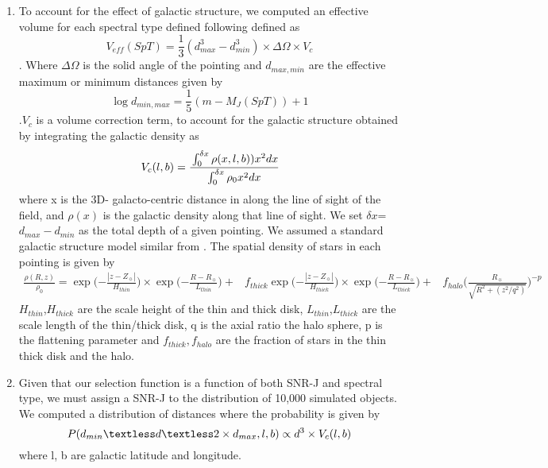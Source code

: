 \documentclass[manuscript]{aastex}
\begin{document}
\begin{enumerate}
\item To account for the effect of galactic structure, we computed an effective volume for each spectral type defined  following \cite{2007ApJ...659..655B} defined as  \begin{equation} V_{eff}(SpT)=\frac{1}{3} (d_{max}^3-d_{min}^3) \times \Delta \Omega \times V_c \end{equation}. Where $\Delta \Omega$ is the solid angle of the pointing and  $d_{max, min}$ are the effective maximum or minimum distances given by \begin{equation} \log d_{min, max} =\frac{1}{5}(m-M_J(SpT))+1 \end{equation}.$V_c$ is a volume correction term, to account for the galactic structure obtained by integrating the galactic density as 
\begin{equation*}
V_c (l, b)=\cfrac{\int _{0} ^{\delta x} \rho (x, l, b))  x^2 dx}{\int  _{0} ^{\delta x} \rho_0  x^2 dx}
\end{equation*} where x is the 3D- galacto-centric distance in along the line of sight of the field, and  $\rho (x)$ is the galactic density along that line of sight. We set $\delta x$= $d_{max}-d_{min}$ as the total depth of a given pointing. We assumed a standard galactic structure model similar from \cite{2008ApJ...673..864J}. The spatial density of stars in each pointing is given by 
\begin{equation*}
\begin{split}
\frac{\rho (R, z)}{\rho_0}=\exp \biggl( {-\frac{|z-Z_\sun|}{H_{thin}}} \biggl) \times \exp \biggl( {-\frac{R-R_\sun}{L_{thin}}} \biggl) +   &
  f _{thick}   \exp \biggl( {-\frac{|z-Z_\sun|}{H_{thick}}} \biggl) \times \exp \biggl( {-\frac{R-R_\sun}{L_{thick}}} \biggl) + &
  f _{halo} \biggl(\frac{R_\sun}{\sqrt{R^2+(z^2/q^2)}} \biggl)^{-p}
\end{split} 
\end{equation*} $H_{thin}$,$H_{thick}$ are the scale height of the thin and thick disk,  $L_{thin}$,$L_{thick}$ are the scale length of the thin/thick disk, q is the axial ratio the halo sphere, p is the flattening parameter and $  f _{thick}, f _{halo}$  are the fraction of stars in the thin thick disk and the halo.

\item Given that our selection function is a function of both SNR-J and spectral type, we must assign a SNR-J to the distribution of 10,000 simulated objects.  We computed a distribution of distances where the probability is given by \begin{equation} P(d_{min} \textless d \textless 2\times d_{max}, l, b) \propto d^3 \times V_c(l, b) \end{equation} where l, b are galactic latitude and longitude.


\end{enumerate}
\end{document}
